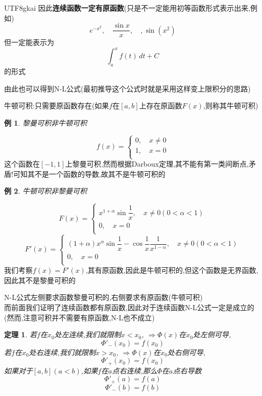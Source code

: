 \documentclass{article}
\newtheorem{theorem}{定理}[subsection]
\newtheorem{example}{例}[subsection]
\newenvironment{cproof}{%
\heiti{证明}\kaishu
}{%
}
\begin{document}
\begin{CJK}{UTF8}{gkai}
因此\textbf{连续函数一定有原函数}(只是不一定能用初等函数形式表示出来,例如)\\
\[e^{-x^2},\quad\dfrac{\sin x}{x},\quad,\sin (x^2)\]
但一定能表示为
\[\int_{a}^{x}f(t)\, dt + C\]
的形式

由此也可以得到N-L公式(最初推导这个公式时就是采用这样变上限积分的思路)

牛顿可积:只需要原函数存在(如果$f$在$[a,b]$上存在原函数$F(x)$,则称其牛顿可积)
\begin{example}
  黎曼可积非牛顿可积
\end{example}
\begin{cproof}
  \begin{equation*}
    f(x) = \begin{cases}
      0,\quad x \neq 0\\
      1,\quad x = 0\\
    \end{cases}
  \end{equation*}
这个函数在$[-1,1]$上黎曼可积,然而根据Darboux定理,其不能有第一类间断点,矛盾!可知其不是一个函数的导数,故其不是牛顿可积的
\end{cproof}
\begin{example}
牛顿可积非黎曼可积
\end{example}
\begin{cproof}
  \begin{equation*}
    F(x) = \begin{cases}
      x^{1 + \alpha}\sin \dfrac{1}{x},\quad x \neq 0(0 < \alpha < 1)\\
      0,\quad x = 0\\
    \end{cases}
  \end{equation*}
  \begin{equation*}
    F'(x) = \begin{cases}
      (1 + \alpha)x^{\alpha}\sin \dfrac{1}{x} -\cos \dfrac{1}{x} \dfrac{1}{x^{1 - \alpha}},\quad x \neq 0(0 < \alpha < 1)\\
      0,\quad x = 0\\
    \end{cases}
  \end{equation*}  
我们考察$f(x) = F'(x)$,其有原函数,因此是牛顿可积的,但这个函数是无界函数,因此其不是黎曼可积的
\end{cproof}

N-L公式左侧要求函数黎曼可积的,右侧要求有原函数(牛顿可积)\\

而前面我们证明了连续函数都有原函数,因此对于连续函数N-L公式一定是成立的(然而,注意可积并不需要有原函数,N-L也不成立)\\
\begin{theorem}
  若$f$在$x_0$处左连续,我们就限制$x < x_0$, $\Rightarrow \varPhi(x)$在$x_0$处左侧可导,
  \[\varPhi'_-(x_0) = f(x_0)\]
  若$f$在$x_0$处右连续,我们就限制$x > x_0$, $\Rightarrow \varPhi(x)$在$x_0$处右侧可导,
  \[\varPhi'_+(x_0) = f(x_0)\]
  如果对于$[a,b](a< b)$,如果$f$在$a$点右连续,那么$\varPhi$在$a$点右导数 \[\varPhi'_+(a) = f(a)\]
  \[\varPhi'_-(b) = f(b)\]
\end{theorem}


\end{CJK}
\end{document}
